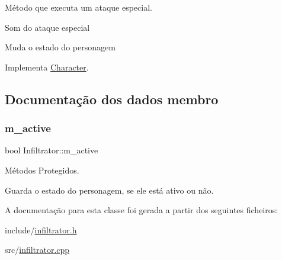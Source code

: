 Método que executa um ataque especial. 

Som do ataque especial

Muda o estado do personagem 

Implementa \mbox{\hyperlink{classCharacter_a447eb9fa4afa57619d6387e0ea178f93}{Character}}.



\subsection{Documentação dos dados membro}
\mbox{\label{classInfiltrator_a57568f6f782efc405e959e5bfffc8163}} 
\subsubsection{\texorpdfstring{m\+\_\+active}{m\_active}}
{\footnotesize\ttfamily bool Infiltrator\+::m\+\_\+active\hspace{0.3cm}{\ttfamily [protected]}}



Métodos Protegidos. 

Guarda o estado do personagem, se ele está ativo ou não. 

A documentação para esta classe foi gerada a partir dos seguintes ficheiros\+:\begin{DoxyCompactItemize}
\item 
include/\mbox{\hyperlink{infiltrator_8h}{infiltrator.\+h}}\item 
src/\mbox{\hyperlink{infiltrator_8cpp}{infiltrator.\+cpp}}\end{DoxyCompactItemize}
